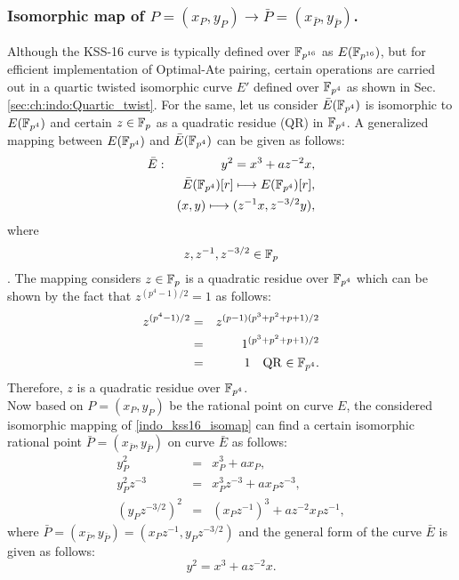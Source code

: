 \subsubsection{Isomorphic map of \texorpdfstring{$P=(x_P,y_P) \to \bar P=(x_{\bar P},y_{\bar P})$}{}.}
Although the KSS-16 curve is typically defined over $\mathbb{F}_{p^{16}}$ as $E(\mathbb{F}_{p^{16}})$, but for efficient implementation of Optimal-Ate pairing, certain operations are carried out in a quartic twisted isomorphic curve $E'$ defined over $\mathbb{F}_{p^4}$ as shown in Sec. \ref{sec:ch:indo:Quartic_twist}. 
For the same, let us consider $\bar{E}(\mathbb{F}_{p^4})$ is isomorphic to $E(\mathbb{F}_{p^4})$ and certain $z \in {\mathbb{F}}_{p}$ as a quadratic residue (QR) in $\mathbb{F}_{p^4}$. 
A generalized mapping between $E(\mathbb{F}_{p^4})$ and $\bar{E}(\mathbb{F}_{p^4})$ can be given as follows:
\begin{eqnarray}
	\bar{E}&:&y^2=x^3+az^{-2}x,\nonumber\\
	&&\bar{E}(\mathbb{F}_{p^4})[r]\longmapsto E(\mathbb{F}_{p^4})[r],\nonumber\\
	&&(x,y)\longmapsto (z^{-1}x,z^{-3/2}y),\label{indo_kss16_isomap}\nonumber\\
\end{eqnarray}
	 where $$z, z^{-1},z^{-3/2}\in {\mathbb{F}}_{p}$$.
The mapping considers $z \in {\mathbb{F}}_{p}$ is a quadratic residue over $\mathbb{F}_{p^4}$ which can be shown by the fact that $z^{(p^4-1)/2} = 1$ as follows:
\begin{eqnarray}
 z^{(p^4-1)/2}& = &z^{(p-1)(p^3+p^2+p+1)/2 } \nonumber \\
& = &1^{(p^3+p^2+p+1)/2 } \nonumber \\
& = & 1 \quad \text{QR $\in \mathbb{F}_{p^4}$}.
\end{eqnarray}
Therefore, $z$ is a quadratic residue over $\mathbb{F}_{p^4}$.\\
Now  based on $P= (x_P, y_P)$ be the rational point on curve $E$, the considered isomorphic mapping of \eqref{indo_kss16_isomap}  can find a certain isomorphic rational point $\bar P = (x_{\bar P}, y_{\bar P})$ on curve $\bar E$ as follows:
\begin{eqnarray}\label{eq:indo_kss16_bar_P}
y_P^2 & = & x_P^3+ax_P, \nonumber \\
y_P^2 z^{-3}& = & x_P^3 z^{-3} +ax_Pz^{-3}, \nonumber \\
(y_P z^{-3/2})^2& = & (x_Pz^{-1})^3 +az^{-2} x_Pz^{-1},
\end{eqnarray}
where $\bar P = (x_{\bar P}, y_{\bar P}) = (x_P z^{-1},y_P z^{-3/2})$ and the general form of the curve $\bar E$ is given as follows:
\begin{equation}\label{eq:indo_kss16_isomorphic_E_bar}
y^2 = x^3+az^{-2}x.
\end{equation}
